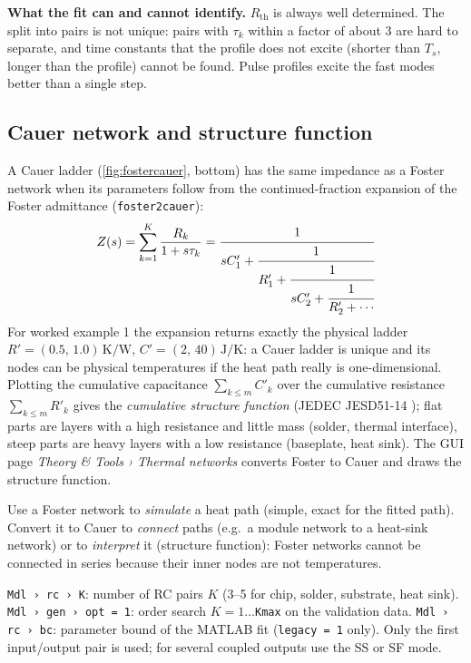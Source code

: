 \documentclass[11pt,a4paper]{article}
\newcommand{\Rth}{R_{\mathrm{th}}}
\newcommand{\cfg}[1]{\texttt{#1}}
\begin{document}
\textbf{What the fit can and cannot identify.} $\Rth$ is always well determined. The split into pairs is not unique:
pairs with $\tau_k$ within a factor of about 3 are hard to separate, and time constants that the profile does not
excite (shorter than $T_s$, longer than the profile) cannot be found. Pulse profiles excite the fast modes better than
a single step.

\subsection{Cauer network and structure function}
A Cauer ladder (\cref{fig:fostercauer}, bottom) has the same impedance as a Foster network when its parameters follow
from the continued-fraction expansion of the Foster admittance (\texttt{foster2cauer}):
\begin{equation}
  Z(s) = \sum_{k=1}^{K}\frac{R_k}{1+s\tau_k} = \cfrac{1}{sC'_1 + \cfrac{1}{R'_1 + \cfrac{1}{sC'_2 +
  \cfrac{1}{R'_2+\dotsb}}}}
\end{equation}
For worked example 1 the expansion returns exactly the physical ladder $R'=(0.5,\,1.0)\,\si{\kelvin\per\watt}$,
$C'=(2,\,40)\,\si{\joule\per\kelvin}$: a Cauer ladder is unique and its nodes can be physical temperatures if the heat
path really is one-dimensional. Plotting the cumulative capacitance $\sum_{k\le m}C'_k$ over the cumulative resistance
$\sum_{k\le m}R'_k$ gives the \emph{cumulative structure function} (JEDEC JESD51-14 \cite{jesd51}); flat parts are
layers with a high resistance and little mass (solder, thermal interface), steep parts are heavy layers with a low
resistance (baseplate, heat sink). The GUI page \emph{Theory \& Tools › Thermal networks} converts Foster to Cauer and
draws the structure function.

\begin{keybox}[Interpretation]
Use a Foster network to \emph{simulate} a heat path (simple, exact for the fitted path). Convert it to Cauer to
\emph{connect} paths (e.g.\ a module network to a heat-sink network) or to \emph{interpret} it (structure function):
Foster networks cannot be connected in series because their inner nodes are not temperatures.
\end{keybox}

\begin{cfgbox}
\cfg{Mdl › rc › K}: number of RC pairs $K$ (3--5 for chip, solder, substrate, heat sink).
\cfg{Mdl › gen › opt = 1}: order search $K=1\dots$\cfg{Kmax} on the validation data.
\cfg{Mdl › rc › bc}: parameter bound of the MATLAB fit (\cfg{legacy = 1} only).
Only the first input/output pair is used; for several coupled outputs use the SS or SF mode.
\end{cfgbox}
\end{document}
